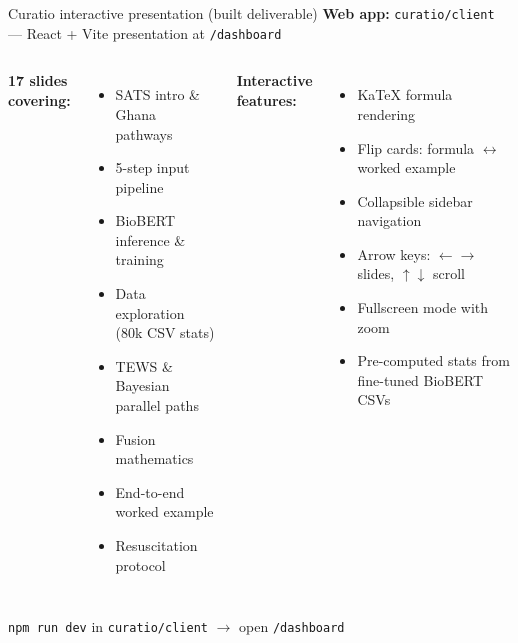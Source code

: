 \begin{frame}{Curatio interactive presentation (built deliverable)}
  \textbf{Web app:} \texttt{curatio/client} --- React + Vite presentation at \texttt{/dashboard}

  \vspace{0.3em}
  \begin{columns}[T]
    \textbf{17 slides covering:}
    \footnotesize
    \begin{itemize}
      \item SATS intro \& Ghana pathways
      \item 5-step input pipeline
      \item BioBERT inference \& training
      \item Data exploration (80k CSV stats)
      \item TEWS \& Bayesian parallel paths
      \item Fusion mathematics
      \item End-to-end worked example
      \item Resuscitation protocol
    \end{itemize}

    \textbf{Interactive features:}
    \footnotesize
    \begin{itemize}
      \item KaTeX formula rendering
      \item Flip cards: formula $\leftrightarrow$ worked example
      \item Collapsible sidebar navigation
      \item Arrow keys: $\leftarrow\!\rightarrow$ slides, $\uparrow\!\downarrow$ scroll
      \item Fullscreen mode with zoom
      \item Pre-computed stats from fine-tuned BioBERT CSVs
    \end{itemize}
  \end{columns}

  \vspace{0.4em}
  \texttt{npm run dev} in \texttt{curatio/client} $\to$ open \texttt{/dashboard}
\end{frame}

